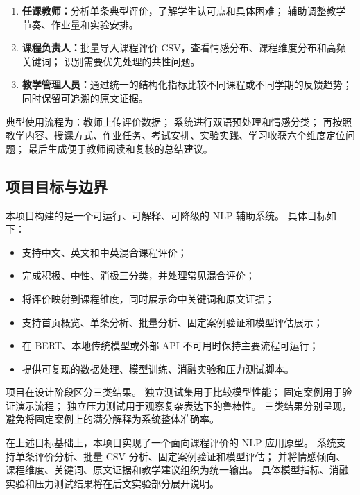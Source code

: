 \begin{enumerate}
  \item \textbf{任课教师：}分析单条典型评价，了解学生认可点和具体困难；
        辅助调整教学节奏、作业量和实验安排。
  \item \textbf{课程负责人：}批量导入课程评价 CSV，查看情感分布、课程维度分布和高频关键词；
        识别需要优先处理的共性问题。
  \item \textbf{教学管理人员：}通过统一的结构化指标比较不同课程或不同学期的反馈趋势；
        同时保留可追溯的原文证据。
\end{enumerate}

典型使用流程为：教师上传评价数据；
系统进行双语预处理和情感分类；
再按照教学内容、授课方式、作业任务、考试安排、实验实践、学习收获六个维度定位问题；
最后生成便于教师阅读和复核的总结建议。

\subsection{项目目标与边界}

本项目构建的是一个可运行、可解释、可降级的 NLP 辅助系统。
具体目标如下：

\begin{itemize}
  \item 支持中文、英文和中英混合课程评价；
  \item 完成积极、中性、消极三分类，并处理常见混合评价；
  \item 将评价映射到课程维度，同时展示命中关键词和原文证据；
  \item 支持首页概览、单条分析、批量分析、固定案例验证和模型评估展示；
  \item 在 BERT、本地传统模型或外部 API 不可用时保持主要流程可运行；
  \item 提供可复现的数据处理、模型训练、消融实验和压力测试脚本。
\end{itemize}

项目在设计阶段区分三类结果。
独立测试集用于比较模型性能；
固定案例用于验证演示流程；
独立压力测试用于观察复杂表达下的鲁棒性。
三类结果分别呈现，避免将固定案例上的满分解释为系统整体准确率。

在上述目标基础上，本项目实现了一个面向课程评价的 NLP 应用原型。
系统支持单条评价分析、批量 CSV 分析、固定案例验证和模型评估；
并将情感倾向、课程维度、关键词、原文证据和教学建议组织为统一输出。
具体模型指标、消融实验和压力测试结果将在后文实验部分展开说明。
